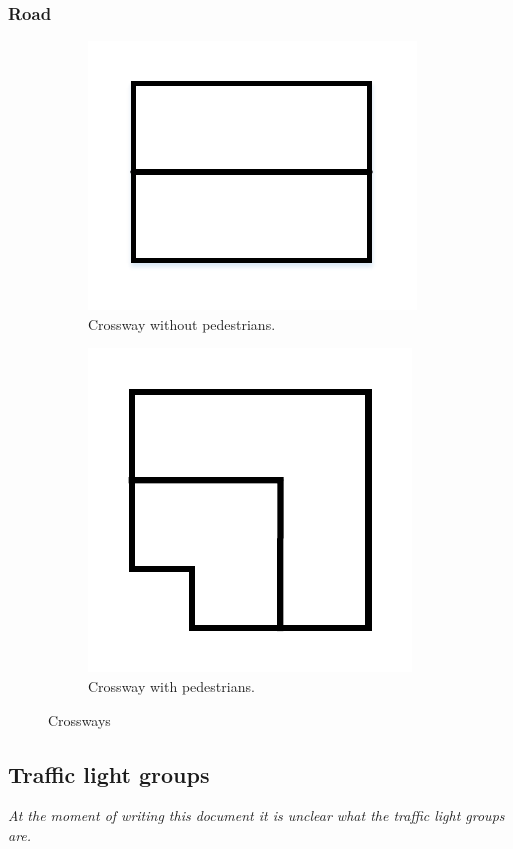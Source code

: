 \subsubsection{Road}
\begin{figure}
	\centering
	\begin{subfigure}{.5\textwidth}
		\centering
		\includegraphics[width=\linewidth]{figures/straightroad.pdf}
		\caption{Crossway without pedestrians.}
		\label{fig:crossa}
	\end{subfigure}%
	\begin{subfigure}{.5\textwidth}
		\centering
		\includegraphics[width=\linewidth]{figures/curvedroad.pdf}
		\caption{Crossway with pedestrians.}
		\label{fig:crossb}
	\end{subfigure}
	\caption{Crossways}
	\label{fig:cross}
\end{figure}

\subsection{Traffic light groups}
\textsl{At the moment of writing this document it is unclear what the traffic light groups are.}
